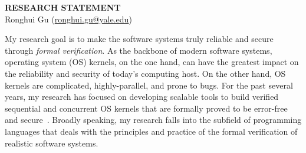 \documentclass[a4paper, 10pt]{article}
\newcommand*{\email}[1]{\normalsize\href{mailto:#1}{#1}}
\begin{document}
\thispagestyle{fancy}
\lhead{}
\rhead{}
\renewcommand{\headrulewidth}{0pt} 
\renewcommand{\footrulewidth}{0pt} 


\pagestyle{fancy}
\lhead{\textcolor{gray}{\it Ronghui Gu}}
\rhead{\textcolor{gray}{\thepage/\totalpages{}}}

\begin{small}

\begin{center}
{\LARGE \bf RESEARCH STATEMENT}\\
\vspace*{0.2cm}
{\normalsize Ronghui Gu (\email{ronghui.gu@yale.edu})}
\end{center}



My research goal is to make the software systems truly reliable and secure through \emph{formal verification}.
As the backbone of 
modern software systems,
operating system (OS) kernels,
on the one hand,
 can have the greatest impact on the reliability and security of today's computing host.
On the other hand, OS kernels are complicated, highly-parallel, and prone to bugs. For the past several years,  my research has focused on developing scalable tools to build verified sequential and concurrent OS kernels that are formally proved to be error-free and secure~\cite{popl15-gu, osdi16-gu, pldi16-security, pldi16-device}.
Broadly speaking, my research
falls into the subfield of programming languages that deals with the 
principles and practice of the formal verification
of realistic software systems.



\end{small}
\end{document}
